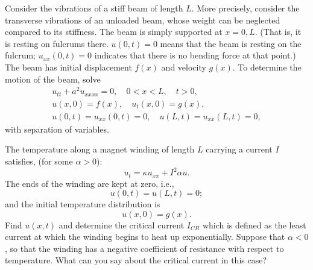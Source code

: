 {\begin{Exercise}
\end{Exercise}







\begin{Exercise}
  \label{exercise vibrations of a beam}
  Consider the vibrations of a stiff beam of length $L$.  More precisely, 
  consider the transverse vibrations of an unloaded beam, whose weight can be 
  neglected compared to its stiffness.  The beam is simply supported at 
  $x = 0,L$. (That is, it is resting on fulcrums there.  $u(0,t) = 0$ means 
  that the beam is resting on the fulcrum; $u_{x x}(0,t) = 0$ indicates that
  there is no bending force at that point.)  The beam has initial displacement 
  $f(x)$ and velocity $g(x)$.  To determine the motion of the beam, solve
  \begin{gather*}
    u_{t t} + a^2 u_{x x x x} = 0, \quad 0 < x < L, \quad t > 0, \\
    u(x,0) = f(x), \quad u_t(x,0) = g(x), \\
    u(0,t) = u_{x x}(0,t) = 0, \quad u(L,t) = u_{x x}(L,t) = 0, 
  \end{gather*}
  with separation of variables.

\end{Exercise}



\begin{Exercise}
  \label{exercise magnet winding}
  The temperature along a magnet winding of length $L$ carrying a current $I$
  satisfies, (for some $\alpha > 0$):
  \[
  u_t = \kappa u_{x x} + I^2 \alpha u.
  \]
  The ends of the winding are kept at zero, i.e.,
  \[
  u(0,t) = u(L,t) = 0;
  \]
  and the initial temperature distribution is
  \[
  u(x,0) = g(x).
  \]
  Find $u(x,t)$ and determine the critical current $I_{CR}$ which is defined
  as the least current at which the winding begins to heat up exponentially.
  Suppose that $\alpha < 0$, so that the winding has a negative coefficient
  of resistance with respect to temperature.  What can you say about the
  critical current in this case?

\end{Exercise}



}
